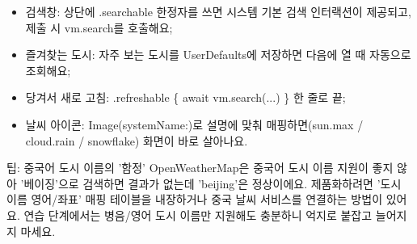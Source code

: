 
\begin{itemize}
  \item 검색창: 상단에 .searchable 한정자를 쓰면 시스템 기본 검색 인터랙션이 제공되고, 제출 시 vm.search를 호출해요;
  \item 즐겨찾는 도시: 자주 보는 도시를 UserDefaults에 저장하면 다음에 열 때 자동으로 조회해요;
  \item 당겨서 새로 고침: .refreshable \{ await vm.search(...) \} 한 줄로 끝;
  \item 날씨 아이콘: Image(systemName:)로 설명에 맞춰 매핑하면(sun.max / cloud.rain / snowflake) 화면이 바로 살아나요.
\end{itemize}

\begin{tcbinfo}{팁: 중국어 도시 이름의 '함정'}
OpenWeatherMap은 중국어 도시 이름 지원이 좋지 않아 '베이징'으로 검색하면 결과가 없는데 'beijing'은 정상이에요. 제품화하려면 '도시 이름 영어/좌표' 매핑 테이블을 내장하거나 중국 날씨 서비스를 연결하는 방법이 있어요. 연습 단계에서는 병음/영어 도시 이름만 지원해도 충분하니 억지로 붙잡고 늘어지지 마세요.

\end{tcbinfo}

